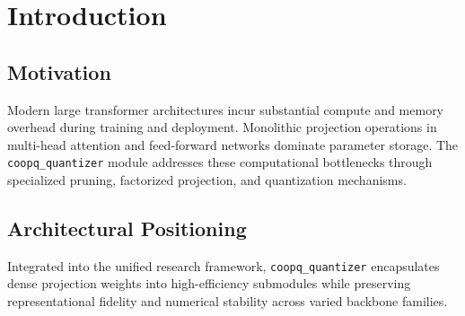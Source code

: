 \section{Introduction}

\subsection{Motivation}
Modern large transformer architectures incur substantial compute and memory overhead during training and deployment. Monolithic projection operations in multi-head attention and feed-forward networks dominate parameter storage. The \texttt{coopq_quantizer} module addresses these computational bottlenecks through specialized pruning, factorized projection, and quantization mechanisms.

\subsection{Architectural Positioning}
Integrated into the unified research framework, \texttt{coopq_quantizer} encapsulates dense projection weights into high-efficiency submodules while preserving representational fidelity and numerical stability across varied backbone families.
